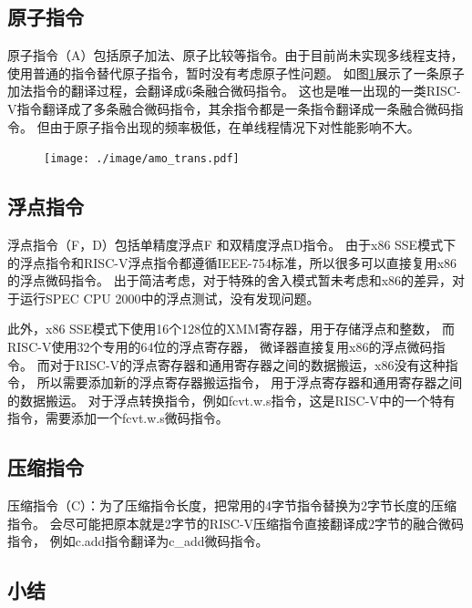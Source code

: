 \subsection{原子指令}
原子指令（A）包括原子加法、原子比较等指令。由于目前尚未实现多线程支持，使用普通的指令替代原子指令，暂时没有考虑原子性问题。
如图\ref{img:amo_trans}展示了一条原子加法指令的翻译过程，会翻译成6条融合微码指令。
这也是唯一出现的一类RISC-V指令翻译成了多条融合微码指令，其余指令都是一条指令翻译成一条融合微码指令。
但由于原子指令出现的频率极低，在单线程情况下对性能影响不大。

\begin{figure}[!htbp]
  \centering
  \texttt{[image: ./image/amo\_trans.pdf]}
  \label{img:amo_trans}
\end{figure}

\subsection{浮点指令}
浮点指令（F，D）包括单精度浮点F 和双精度浮点D指令。
由于x86 SSE模式下的浮点指令和RISC-V浮点指令都遵循IEEE-754标准，所以很多可以直接复用x86的浮点微码指令。
出于简洁考虑，对于特殊的舍入模式暂未考虑和x86的差异，对于运行SPEC CPU 2000中的浮点测试，没有发现问题。

此外，x86 SSE模式下使用16个128位的XMM寄存器，用于存储浮点和整数，
而RISC-V使用32个专用的64位的浮点寄存器，
微译器直接复用x86的浮点微码指令。
而对于RISC-V的浮点寄存器和通用寄存器之间的数据搬运，x86没有这种指令，
所以需要添加新的浮点寄存器搬运指令，
用于浮点寄存器和通用寄存器之间的数据搬运。
对于浮点转换指令，例如fcvt.w.s指令，这是RISC-V中的一个特有指令，需要添加一个fcvt.w.s微码指令。

\subsection{压缩指令}
压缩指令（C）：为了压缩指令长度，把常用的4字节指令替换为2字节长度的压缩指令。
会尽可能把原本就是2字节的RISC-V压缩指令直接翻译成2字节的融合微码指令，
例如c.add指令翻译为c\_add微码指令。



\subsection{小结}

